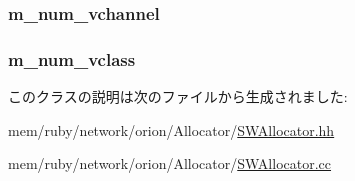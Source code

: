 \label{classSWAllocator_a56cb909217f28866d2a08a40adb3ef08}
\hypertarget{classSWAllocator_ac0b1d8a0523e7c7ce285c7917a764c9f}{
\subsubsection[{m\_\-num\_\-vchannel}]{ {\bf m\_\-num\_\-vchannel}}}
\label{classSWAllocator_ac0b1d8a0523e7c7ce285c7917a764c9f}
\hypertarget{classSWAllocator_ac6cc31c075b331538b0aaa0bb593b2e3}{
\subsubsection[{m\_\-num\_\-vclass}]{ {\bf m\_\-num\_\-vclass}}}
\label{classSWAllocator_ac6cc31c075b331538b0aaa0bb593b2e3}


このクラスの説明は次のファイルから生成されました:\begin{DoxyCompactItemize}
\item 
mem/ruby/network/orion/Allocator/\hyperlink{SWAllocator_8hh}{SWAllocator.hh}\item 
mem/ruby/network/orion/Allocator/\hyperlink{SWAllocator_8cc}{SWAllocator.cc}\end{DoxyCompactItemize}
